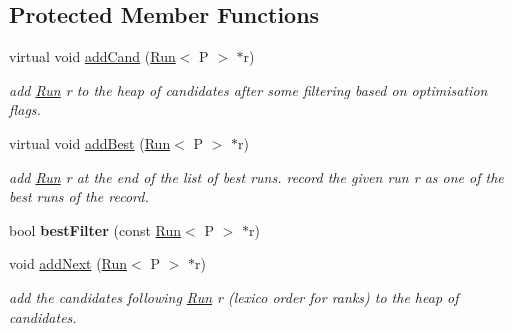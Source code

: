 \subsection*{Protected Member Functions}
\begin{DoxyCompactItemize}
\item 
virtual void \mbox{\hyperlink{classKrecord_ae88ed30977296575c7b60eab0138bbb1}{add\+Cand}} (\mbox{\hyperlink{classRun}{Run}}$<$ P $>$ $\ast$r)
\begin{DoxyCompactList}\small\item\em add \mbox{\hyperlink{classRun}{Run}} r to the heap of candidates after some filtering based on optimisation flags. \end{DoxyCompactList}\item 
virtual void \mbox{\hyperlink{classKrecord_a101fe075076b9aecb97014a04e023c26}{add\+Best}} (\mbox{\hyperlink{classRun}{Run}}$<$ P $>$ $\ast$r)
\begin{DoxyCompactList}\small\item\em add \mbox{\hyperlink{classRun}{Run}} r at the end of the list of best runs. record the given run r as one of the best runs of the record. \end{DoxyCompactList}\item 
\mbox{\label{classKrecord_a66b55817885fd985264ca90dbb3dc7ae}} 
bool {\bfseries best\+Filter} (const \mbox{\hyperlink{classRun}{Run}}$<$ P $>$ $\ast$r)
\item 
void \mbox{\hyperlink{classKrecord_a1cee958825882ef5c782382770688bbe}{add\+Next}} (\mbox{\hyperlink{classRun}{Run}}$<$ P $>$ $\ast$r)
\begin{DoxyCompactList}\small\item\em add the candidates following \mbox{\hyperlink{classRun}{Run}} r (lexico order for ranks) to the heap of candidates. \end{DoxyCompactList}\end{DoxyCompactItemize}
